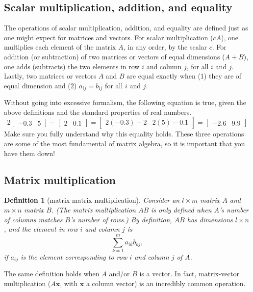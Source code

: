 \documentclass[draft,12pt]{report}
\newtheorem{definition}{Definition}
\renewcommand{\vec}[1]{\mathbf{#1}}
\begin{document}
\subsection{Scalar multiplication, addition, and equality}

The operations of scalar multiplication, addition, and equality are defined just as one might expect for matrices and vectors. For scalar multiplication ($cA$), one multiplies each element of the matrix $A$, in any order, by the scalar $c$. For addition (or subtraction) of two matrices or vectors of equal dimensions ($A + B$), one adds (subtracts) the two elements in row $i$ and column $j$, for all $i$ and $j$. Lastly, two matrices or vectors $A$ and $B$ are equal exactly when (1) they are of equal dimension and (2) $a_{ij} = b_{ij}$ for all $i$ and $j$.

Without going into excessive formalism, the following equation is true, given the above definitions and the standard properties of real numbers.
\[ 2\begin{bmatrix} -0.3 & 5 \end{bmatrix} - \begin{bmatrix} 2 & 0.1 \end{bmatrix} = \begin{bmatrix} 2(-0.3) - 2 & 2(5) - 0.1 \end{bmatrix} = \begin{bmatrix} -2.6 & 9.9 \end{bmatrix} \]
Make sure you fully understand why this equality holds. These three operations are some of the most fundamental of matrix algebra, so it is important that you have them down!

\subsection{Matrix multiplication}

\begin{definition}[matrix-matrix multiplication]
    Consider an $l \times m$ matrix $A$ and $m \times n$ matrix $B$. (The matrix multiplication $AB$ is only defined when $A$'s number of columns matches $B$'s number of rows.) By definition, $AB$ has dimensions $l \times n$, and the element in row $i$ and column $j$ is
    \[ \sum_{k = 1}^m a_{ik}b_{kj}, \]
    if $a_{ij}$ is the element corresponding to row $i$ and column $j$ of $A$.
\end{definition}
\noindent
The same definition holds when $A$ and/or $B$ is a vector. In fact, matrix-vector multiplication ($A\vec{x}$, with $\vec{x}$ a column vector) is an incredibly common operation.
\end{document}
